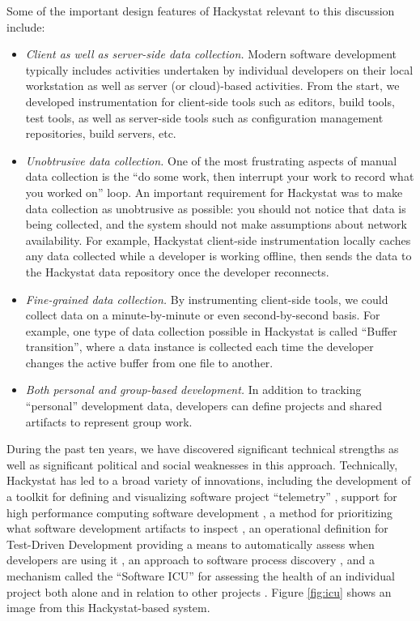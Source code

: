 \documentclass[]{article}
\begin{document}
Some of the important design features of Hackystat relevant to this discussion include:
\begin{itemize}
\item {\em Client as well as server-side data collection.}  Modern software development
  typically includes activities undertaken by individual developers on their local
  workstation as well as server (or cloud)-based activities. From the start, we developed
  instrumentation for client-side tools such as editors, build tools, test tools, as well
  as server-side tools such as configuration management repositories, build servers, etc.
\item {\em Unobtrusive data collection.}  One of the most frustrating aspects of manual data
  collection is the ``do some work, then interrupt your work to record what you worked on''
  loop. An important requirement for Hackystat was to make data collection as unobtrusive
  as possible: you should not notice that data is being collected, and the system should
  not make assumptions about network availability. For example, Hackystat client-side
  instrumentation locally caches any data collected while a developer is working
  offline, then sends the data to the Hackystat data repository once the developer
  reconnects. 
\item {\em Fine-grained data collection.}  By instrumenting client-side tools, we could
  collect data on a minute-by-minute or even second-by-second basis. For example, one type
  of data collection possible in Hackystat is called ``Buffer transition'', where a data
  instance is collected each time the developer changes the active buffer from one file to
  another.
\item {\em Both personal and group-based development.}  In addition to tracking ``personal''
  development data, developers can define projects
  and shared artifacts to represent group work.  
\end{itemize}

During the past ten years, we have discovered significant technical strengths as well as
significant political and social weaknesses in this approach.  Technically, Hackystat has
led to a broad variety of innovations, including the development of a toolkit for defining
and visualizing software project ``telemetry'' \cite{csdl2-04-11}, support for high
performance computing software development \cite{csdl2-04-22}, a method for prioritizing
what software development artifacts to inspect \cite{csdl2-05-01}, an operational
definition for Test-Driven Development providing a means to automatically assess when
developers are using it \cite{csdl2-09-01}, an approach to software process discovery
\cite{csdl2-10-09}, and a mechanism called the ``Software ICU'' for assessing the health
of an individual project both alone and in relation to other projects \cite{csdl2-09-02}.
Figure \ref{fig:icu} shows an image from this Hackystat-based system.
\end{document}
